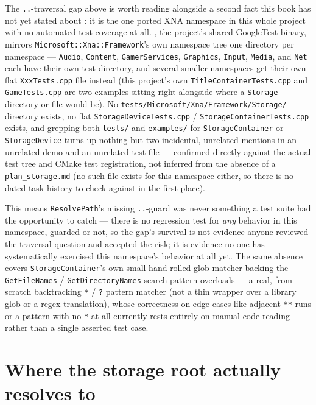 The \texttt{..}-traversal gap above is worth reading alongside a second fact this book has not
yet stated about : it is the one ported XNA namespace in this whole project
with no automated test coverage at all. , the project's shared GoogleTest
binary, mirrors \texttt{Microsoft::Xna::Framework}'s own namespace tree one directory per
namespace --- \texttt{Audio}, \texttt{Content}, \texttt{GamerServices}, \texttt{Graphics},
\texttt{Input}, \texttt{Media}, and \texttt{Net} each have their own test directory, and
several smaller namespaces get their own flat \texttt{XxxTests.cpp} file instead (this
project's own \texttt{TitleContainerTests.cpp} and \texttt{GameTests.cpp} are two examples
sitting right alongside where a \texttt{Storage} directory or file would be). No
\texttt{tests/Microsoft/Xna/Framework/Storage/} directory exists, no flat
\texttt{StorageDeviceTests.cpp} / \texttt{StorageContainerTests.cpp} exists, and grepping both
\texttt{tests/} and \texttt{examples/} for \texttt{StorageContainer} or \texttt{StorageDevice}
turns up nothing but two incidental, unrelated mentions in an unrelated demo and an unrelated
 test file --- confirmed directly against the actual test tree and CMake
test registration, not inferred from the absence of a \texttt{plan\_storage.md} (no such file
exists for this namespace either, so there is no dated task history to check against in the
first place).

This means \texttt{ResolvePath}'s missing \texttt{..}-guard was never something a test suite
had the opportunity to catch --- there is no regression test for \emph{any} behavior in this
namespace, guarded or not, so the gap's survival is not evidence anyone reviewed the traversal
question and accepted the risk; it is evidence no one has systematically exercised this
namespace's behavior at all yet. The same absence covers \texttt{StorageContainer}'s own small
hand-rolled glob matcher backing the \texttt{GetFileNames} / \texttt{GetDirectoryNames} search-pattern
overloads --- a real, from-scratch backtracking \texttt{*} / \texttt{?} pattern matcher (not a
thin wrapper over a library glob or a regex translation), whose correctness on edge cases like
adjacent \texttt{**} runs or a pattern with no \texttt{*} at all currently rests entirely on
manual code reading rather than a single asserted test case.

\section{Where the storage root actually resolves to}

